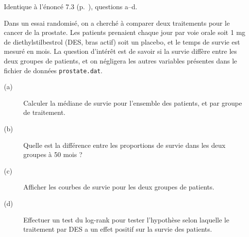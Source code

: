 \begin{exo}\label{exo:11.2}
{\footnotesize Identique à l'énoncé 7.3 (p.~\pageref{exo:7.3}), questions
  a–d}.

Dans un essai randomisé, on a cherché à comparer deux traitements pour le
cancer de la prostate. Les patients prenaient chaque jour par voie orale
soit 1 mg de diethylstilbestrol (DES, bras actif) soit un placebo, et le
temps de survie est mesuré en mois.\autocite{collett94} La question
d'intérêt est de savoir si la survie diffère entre les deux groupes de
patients, et on négligera les autres variables présentes dans le fichier de
données \texttt{prostate.dat}. 
\begin{description}
\item[(a)] Calculer la médiane de survie pour l'ensemble des patients, et
  par groupe de traitement.
\item[(b)] Quelle est la différence entre les proportions de survie dans les
  deux groupes à 50 mois ?
\item[(c)] Afficher les courbes de survie pour les deux groupes de patients.
\item[(d)] Effectuer un test du log-rank pour tester l'hypothèse selon
  laquelle le traitement par DES a un effet positif sur la survie des
  patients. 
\end{description}
\end{exo}







